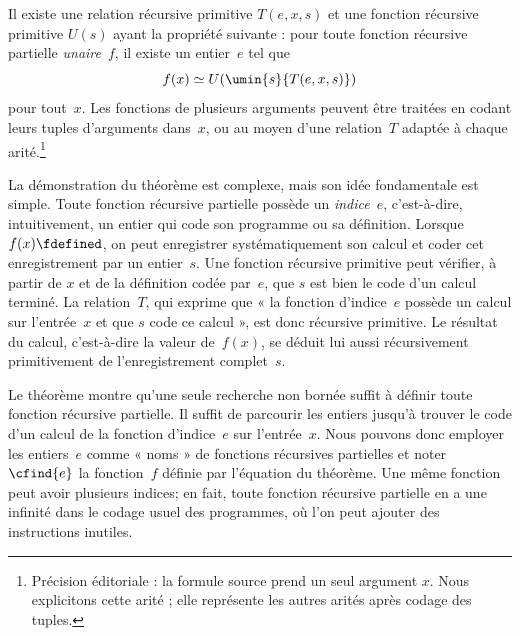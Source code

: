 \documentclass[../../../include/open-logic-section]{subfiles}
\begin{document}

\begin{thm}
Il existe une relation récursive primitive $T(e,x,s)$ et une
fonction récursive primitive $U(s)$ ayant la propriété suivante :
pour toute fonction récursive partielle \emph{unaire}~$f$,
il existe un entier~$e$ tel que
\[
f(x) \simeq U(\umin{s}{T(e, x, s)})
\]
pour tout~$x$. Les fonctions de plusieurs arguments peuvent
être traitées en codant leurs tuples d'arguments dans~$x$,
ou au moyen d'une relation~$T$ adaptée à chaque arité.\footnote{Précision éditoriale : la formule source prend un seul argument $x$. Nous explicitons cette arité ; elle représente les autres arités après codage des tuples.}
\end{thm}

\begin{explain}
La démonstration du théorème est complexe, mais son idée
fondamentale est simple. Toute fonction récursive partielle
possède un \emph{indice}~$e$, c'est-à-dire, intuitivement,
un entier qui code son programme ou sa définition. Lorsque
$f(x) \fdefined$, on peut enregistrer systématiquement
son calcul et coder cet enregistrement par un entier~$s$.
Une fonction récursive primitive peut vérifier, à partir de
$x$ et de la définition codée par~$e$, que $s$ est bien
le code d'un calcul terminé. La relation~$T$, qui exprime que
« la fonction d'indice~$e$ possède un calcul sur l'entrée~$x$
et que $s$ code ce calcul », est donc récursive primitive.
Le résultat du calcul, c'est-à-dire la valeur de~$f(x)$,
se déduit lui aussi récursivement primitivement de
l'enregistrement complet~$s$.

Le théorème montre qu'une seule recherche non bornée suffit
à définir toute fonction récursive partielle. Il suffit de
parcourir les entiers jusqu'à trouver le code d'un calcul
de la fonction d'indice~$e$ sur l'entrée~$x$. Nous pouvons
donc employer les entiers~$e$ comme « noms » de fonctions
récursives partielles et noter $\cfind{e}$ la fonction~$f$
définie par l'équation du théorème. Une même fonction peut
avoir plusieurs indices; en fait, toute fonction récursive
partielle en a une infinité dans le codage usuel des programmes, où l'on peut ajouter des instructions inutiles.
\end{explain}
\end{document}
